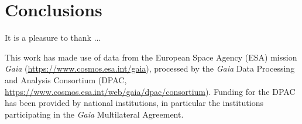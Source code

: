 \section{Conclusions} \label{sec:conclusions}


\begin{acknowledgements}

It is a pleasure to thank ...



This work has made use of data from the European Space Agency (ESA) mission
{\it Gaia} (\url{https://www.cosmos.esa.int/gaia}), processed by the {\it Gaia}
Data Processing and Analysis Consortium (DPAC,
\url{https://www.cosmos.esa.int/web/gaia/dpac/consortium}). Funding for the DPAC
has been provided by national institutions, in particular the institutions
participating in the {\it Gaia} Multilateral Agreement.

\end{acknowledgements}







